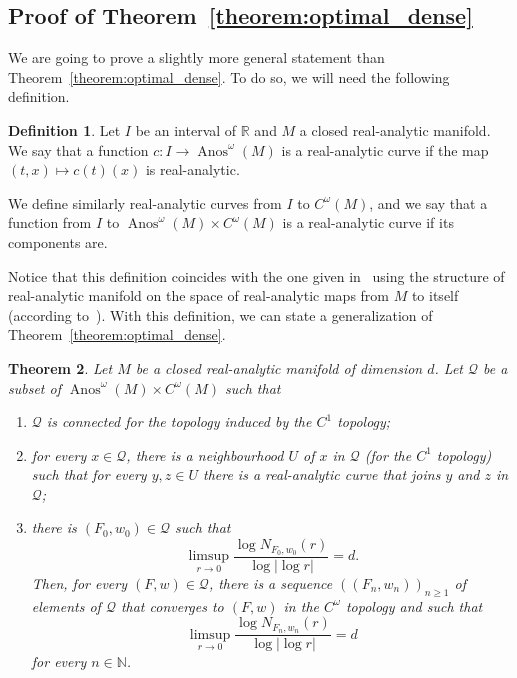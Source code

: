 \documentclass[10pt]{amsart}
\newtheorem{theo}{Theorem}[section]
\theoremstyle{definition}\newtheorem{defi}[theo]{Definition}\newtheorem{rema}[theo]{Remark}\newtheorem{exam}[theo]{Example}\newtheorem{exem}[theo]{Example}\newtheorem{nota}[theo]{Notation}
\DeclareMathOperator{\Anos}{Anos}
\newcommand{\clQ}{\mathcal{Q}}
\newcommand{\bbN}{\mathbb{N}}
\newcommand{\bbR}{\mathbb{R}}
\newcommand*{\romanenumi}{\renewcommand*{\theenumi}{\roman{enumi}}}
\begin{document}
\subsection{Proof of Theorem~\ref{theorem:optimal_dense}}\label{subsection:optimal_dense}

We are going to prove a slightly more general statement than Theorem~\ref{theorem:optimal_dense}. To do so, we will need the following definition.

\begin{defi}\label{definition:analytic_curve}
Let $I$ be an interval of $\bbR$ and $M$ a closed real-analytic manifold. We say that a function $c : I \to \Anos^\omega(M)$ is a real-analytic curve if the map $(t,x) \mapsto c(t)(x)$ is real-analytic.

We define similarly real-analytic curves from $I$ to $C^\omega(M)$, and we say that a function from $I$ to $\Anos^\omega(M) \times C^\omega(M)$ is a real-analytic curve if its components are.
\end{defi}

Notice that this definition coincides with the one given in~\cite{kriegl_michor_real_analytic} using the structure of real-analytic manifold on the space of real-analytic maps from $M$ to itself (according to~\cite[Lemma~8.6]{kriegl_michor_real_analytic}). With this definition, we can state a generalization of Theorem~\ref{theorem:optimal_dense}.

\begin{theo}\label{theorem:more_general}
Let $M$ be a closed real-analytic manifold of dimension $d$. Let $\clQ$ be a subset of $\Anos^\omega(M) \times C^\omega(M)$ such that
\begin{enumerate}\romanenumi
\item\label{theo4.5.1} $\clQ$ is connected for the topology induced by the $C^1$ topology;
\item\label{theo4.5.2} for every $x \in \clQ$, there is a neighbourhood $U$ of $x$ in $\clQ$ (for the $C^1$ topology) such that for every $y,z \in U$ there is a real-analytic curve that joins $y$ and $z$ in $\clQ$;
\item\label{theo4.5.3} there is $(F_0,w_0) \in \clQ$ such that
\begin{equation*}
\limsup_{r \to 0} \frac{\log N_{F_0,w_0}(r)}{\log |\log r|} = d.
\end{equation*}
Then, for every $(F,w) \in \clQ$, there is a sequence $((F_n,w_n))_{n \geq 1}$ of elements of $\clQ$ that converges to $(F,w)$ in the $C^\omega$ topology and such that
\begin{equation*}
\limsup_{r \to 0} \frac{\log N_{F_n,w_n}(r)}{\log |\log r|} = d
\end{equation*}
for every $n \in \bbN$.
\end{enumerate}
\end{theo}
\end{document}
